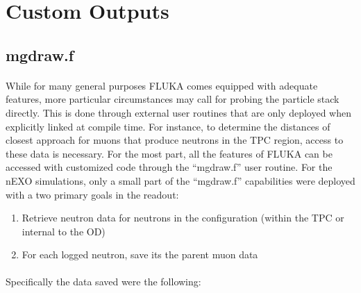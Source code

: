 \section{Custom Outputs}

\subsection{mgdraw.f}

\paragraph{}
While for many general purposes FLUKA comes equipped with adequate features, more particular circumstances may call for probing the particle stack directly. This is done through external user routines that are only deployed when explicitly linked at compile time. For instance, to determine the distances of closest approach for muons that produce neutrons in the TPC region, access to these data is necessary. For the most part, all the features of FLUKA can be accessed with customized code through the ``mgdraw.f'' user routine. For the nEXO simulations, only a small part of the ``mgdraw.f'' capabilities were deployed with a two primary goals in the readout:

\begin{enumerate}
    \item Retrieve neutron data for neutrons in the configuration (within the TPC or internal to the OD)
    \item For each logged neutron, save its the parent muon data
\end{enumerate}

\paragraph{}
Specifically the data saved were the following:

\footnotesize

